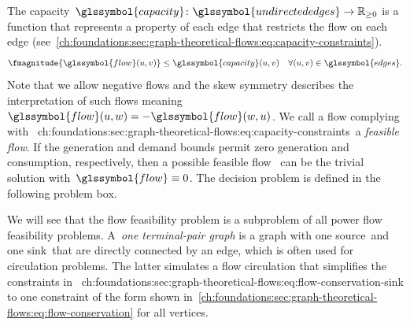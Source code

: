The capacity~$\glssymbol{capacity} \colon \glssymbol{undirectededges} \to
\posreals$ is a function that represents a property of each edge that restricts
the flow on each edge
(see~\cref{ch:foundations:sec:graph-theoretical-flows:eq:capacity-constraints}).
% 
\begin{align}
    \fmagnitude{\glssymbol{flow}(\vertexa,\vertexb)} 
    &\leq \glssymbol{capacity}(\vertexa,\vertexb)
    &\forall(\vertexa,\vertexb)\in\glssymbol{edges}.
    \label{ch:foundations:sec:graph-theoretical-flows:eq:capacity-constraints}%
\end{align}
% 
Note that we allow negative flows and the skew symmetry describes the
interpretation of such flows meaning~$\glssymbol{flow}(\vertexa,\vertexc) = -
\glssymbol{flow}(\vertexc,\vertexa)$. We call a flow complying
with~
{ch:foundations:sec:graph-theoretical-flows:eq:capacity-constraints}~a
\emph{feasible flow}. If the generation and demand bounds permit zero generation
and consumption, respectively, then a possible feasible flow~
can be the trivial solution with~$\glssymbol{flow}\equiv 0$. The decision
problem is defined in the following problem box.
% 
\begingroup
    
    \label{ch:fundamentals:problems:FlowFEAS-Decision_Problem}
\endgroup
% 
We will see that the flow feasibility problem is a subproblem of all power flow
feasibility problems. A~\emph{one terminal-pair graph} is a graph with one
source~\source and one sink~\sink that are directly connected by an edge, which
is often used for circulation problems. The latter simulates a flow circulation
that simplifies the constraints
in~
{ch:foundations:sec:graph-theoretical-flows:eq:flow-conservation-sink} to one
constraint of the form shown
in~\cref{ch:foundations:sec:graph-theoretical-flows:eq:flow-conservation} for
all vertices.
% 
